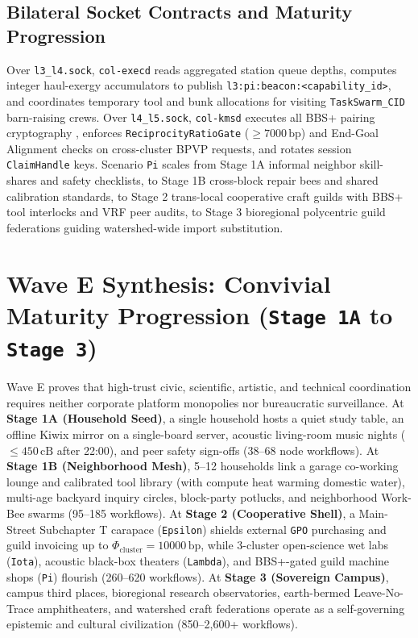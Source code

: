 \subsection{Bilateral Socket Contracts and Maturity Progression}

Over \texttt{l3\_l4.sock}, \texttt{col-execd} reads aggregated station queue depths, computes integer
haul-exergy accumulators to publish \texttt{l3:pi:beacon:<capability\_id>}, and coordinates temporary tool
and bunk allocations for visiting \texttt{TaskSwarm\_CID} barn-raising crews. Over \texttt{l4\_l5.sock},
\texttt{col-kmsd} executes all BBS+ pairing cryptography \parencite{camenisch2004signature}, enforces
\texttt{ReciprocityRatioGate} ($\ge 7000\,\mathrm{bp}$) and End-Goal Alignment checks on cross-cluster BPVP
requests, and rotates session \texttt{ClaimHandle} keys. Scenario \texttt{Pi} scales from Stage 1A informal
neighbor skill-shares and safety checklists, to Stage 1B cross-block repair bees and shared calibration
standards, to Stage 2 trans-local cooperative craft guilds with BBS+ tool interlocks and VRF peer audits,
to Stage 3 bioregional polycentric guild federations guiding watershed-wide import substitution.

\section{Wave E Synthesis: Convivial Maturity Progression (\texttt{Stage 1A} to \texttt{Stage 3})}
\label{sec:wave-e-maturity}

Wave E proves that high-trust civic, scientific, artistic, and technical coordination requires neither
corporate platform monopolies nor bureaucratic surveillance. At \textbf{Stage 1A (Household Seed)}, a single
household hosts a quiet study table, an offline Kiwix mirror on a single-board server, acoustic living-room
music nights ($\le 450\,\mathrm{cB}$ after 22:00), and peer safety sign-offs (38--68 node workflows). At
\textbf{Stage 1B (Neighborhood Mesh)}, 5--12 households link a garage co-working lounge and calibrated tool
library (with compute heat warming domestic water), multi-age backyard inquiry circles, block-party
potlucks, and neighborhood Work-Bee swarms (95--185 workflows). At \textbf{Stage 2 (Cooperative Shell)}, a
Main-Street Subchapter T carapace (\texttt{Epsilon}) shields external \texttt{GPO} purchasing and guild
invoicing up to $\Phi_{\mathrm{cluster}} = 10000\,\mathrm{bp}$, while 3-cluster open-science wet labs
(\texttt{Iota}), acoustic black-box theaters (\texttt{Lambda}), and BBS+-gated guild machine shops
(\texttt{Pi}) flourish (260--620 workflows). At \textbf{Stage 3 (Sovereign Campus)}, campus third places,
bioregional research observatories, earth-bermed Leave-No-Trace amphitheaters, and watershed craft
federations operate as a self-governing epistemic and cultural civilization (850--2,600+ workflows).

